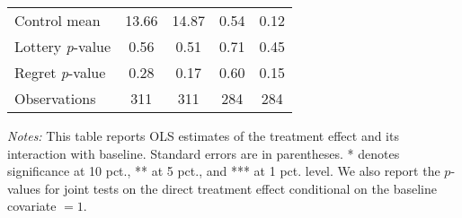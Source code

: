 \begin{table}[ht]
{\begin{threeparttable}
\begin{tabular}{l*{4}{c}}
Control mean    &    13.66         &    14.87         &     0.54         &     0.12         \\
Lottery \emph{p}-value&     0.56         &     0.51         &     0.71         &     0.45         \\
Regret \emph{p}-value&     0.28         &     0.17         &     0.60         &     0.15         \\
Observations    &      311         &      311         &      284         &      284         \\
\bottomrule \end{tabular} \begin{tablenotes}[flushleft] \footnotesize \item \emph{Notes:} This table reports OLS estimates of the treatment effect and its interaction with baseline. Standard errors are in parentheses. * denotes significance at 10 pct., ** at 5 pct., and *** at 1 pct. level. We also report the \(p\)-values for joint tests on the direct treatment effect conditional on the baseline covariate $= 1$. \end{tablenotes} \end{threeparttable} } \end{table}

